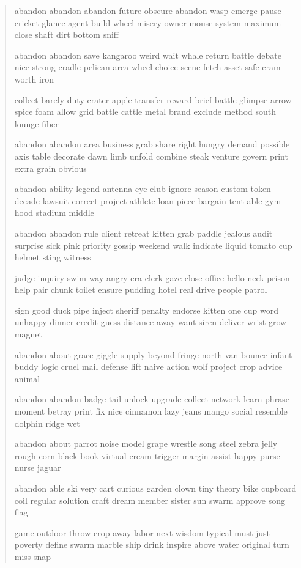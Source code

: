 \documentclass[a5paper, twoside]{book}
\begin{document}
\begin{verse}
 abandon abandon abandon future obscure abandon wasp emerge pause cricket glance agent build wheel misery owner mouse system maximum close shaft dirt bottom sniff

 abandon abandon save kangaroo weird wait whale return battle debate nice strong cradle pelican area wheel choice scene fetch asset safe cram worth iron

 collect barely duty crater apple transfer reward brief battle glimpse arrow spice foam allow grid battle cattle metal brand exclude method south lounge fiber

 abandon abandon area business grab share right hungry demand possible axis table decorate dawn limb unfold combine steak venture govern print extra grain obvious

 abandon ability legend antenna eye club ignore season custom token decade lawsuit correct project athlete loan piece bargain tent able gym hood stadium middle

 abandon abandon rule client retreat kitten grab paddle jealous audit surprise sick pink priority gossip weekend walk indicate liquid tomato cup helmet sting witness

 judge inquiry swim way angry era clerk gaze close office hello neck prison help pair chunk toilet ensure pudding hotel real drive people patrol

 sign good duck pipe inject sheriff penalty endorse kitten one cup word unhappy dinner credit guess distance away want siren deliver wrist grow magnet

 abandon about grace giggle supply beyond fringe north van bounce infant buddy logic cruel mail defense lift naive action wolf project crop advice animal

 abandon abandon badge tail unlock upgrade collect network learn phrase moment betray print fix nice cinnamon lazy jeans mango social resemble dolphin ridge wet

 abandon about parrot noise model grape wrestle song steel zebra jelly rough corn black book virtual cream trigger margin assist happy purse nurse jaguar

 abandon able ski very cart curious garden clown tiny theory bike cupboard coil regular solution craft dream member sister sun swarm approve song flag

 game outdoor throw crop away labor next wisdom typical must just poverty define swarm marble ship drink inspire above water original turn miss snap


\end{verse}
\end{document}
